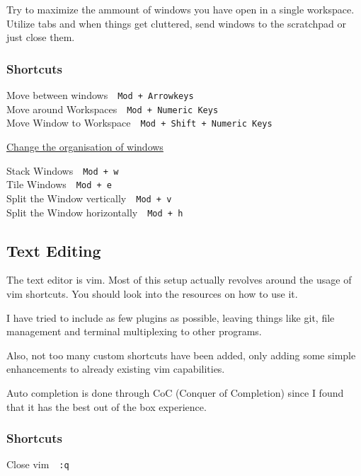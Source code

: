 \documentclass{article}
\let\src\texttt
\newcommand{\shortcut}[2]{#1~\dotfill{}~\src{#2}\\} %
\newcommand{\editor}{vim}
\newcommand{\shortcuttitle}[1]{\underline{#1}}
\begin{document}
Try to maximize the ammount of windows you have open in a single 
workspace. Utilize tabs and when things get cluttered, send 
windows to the scratchpad or just close them.

\subsubsection{Shortcuts}

\begin{minipage}{\textwidth}

\shortcut{Move between windows}{Mod + Arrowkeys}
\shortcut{Move around Workspaces}{Mod + Numeric Keys}
\shortcut{Move Window to Workspace}{Mod + Shift + Numeric Keys}

\end{minipage}

\begin{minipage}{\textwidth}
    \shortcuttitle{Change the organisation of windows}
    \newline

    \shortcut{Stack Windows}{Mod + w}
    \shortcut{Tile Windows}{Mod + e}

    \shortcut{Split the Window vertically}{Mod + v}
    \shortcut{Split the Window horizontally}{Mod + h}
\end{minipage}

\subsection{Text Editing}

The text editor is \editor. Most of this setup actually 
revolves around the usage of \editor{} shortcuts. You should 
look into the resources on how to use it. 

I have tried to include as few plugins as possible, leaving
things like git, file management and terminal multiplexing to other programs. 

Also, not too many custom shortcuts have been added, only adding 
some simple enhancements to already existing vim capabilities.

Auto completion is done through CoC (Conquer of Completion) since I found that it has 
the best out of the box experience.

\subsubsection{Shortcuts}

\shortcut{Close \editor}{:q}
\end{document}
